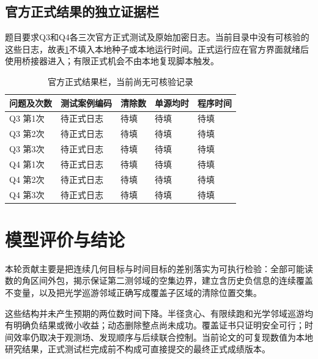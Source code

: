 \documentclass[UTF8,a4paper,zihao=-4,fontset=mac]{ctexart}
\begin{document}
\subsection{官方正式结果的独立证据栏}
题目要求Q3和Q4各三次官方正式测试及原始加密日志。当前目录中没有可核验的这些日志，故表\ref{tab:formal}不填入本地种子或本地运行时间。正式运行应在官方界面就绪后使用桥接器进入；有限正式机会不由本地复现脚本触发。
\begin{table}[H]\centering\small\caption{官方正式结果栏，当前尚无可核验记录}\label{tab:formal}
\begin{tabular}{lllll}\toprule 问题及次数&测试案例编码&清除数&单源均时&程序时间\\\midrule
Q3 第1次&待正式日志&待填&待填&待填\\Q3 第2次&待正式日志&待填&待填&待填\\Q3 第3次&待正式日志&待填&待填&待填\\
Q4 第1次&待正式日志&待填&待填&待填\\Q4 第2次&待正式日志&待填&待填&待填\\Q4 第3次&待正式日志&待填&待填&待填\\\bottomrule\end{tabular}\end{table}

\section{模型评价与结论}
本轮贡献主要是把连续几何目标与时间目标的差别落实为可执行检验：全部可能读数的角区间外包，揭示保证第二测邻域的空集边界，建立含历史负信息的连续覆盖不变量，以及把光学巡游邻域正确写成覆盖子区域的清除位置交集。

这些结构并未产生预期的两位数时间下降。半径贪心、有限续跑和光学邻域巡游均有明确负结果或微小收益；动态删除整点尚未成功。覆盖证书只证明安全可行；时间效率仍取决于观测场、发现顺序与后续联合控制。当前论文的可复现数值为本地研究结果，正式测试栏完成前不构成可直接提交的最终正式成绩版本。
\end{document}
